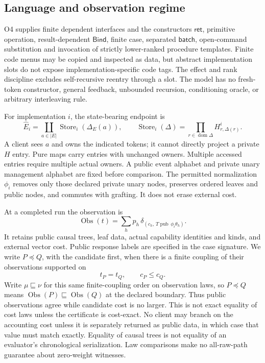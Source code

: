 \documentclass[11pt,a4paper]{article}
\theoremstyle{definition}
\newcommand{\Store}{\operatorname{Store}}
\newcommand{\Obs}{\operatorname{Obs}}
\newcommand{\dom}{\operatorname{dom}}
\newcommand{\Ret}{\mathsf{ret}}
\newcommand{\Bind}{\mathsf{Bind}}
\newcommand{\Batch}{\mathsf{batch}}
\begin{document}
\subsection{Language and observation regime}\label{sec:core-language}
O4 supplies finite dependent interfaces and the constructors
$\Ret$, primitive operation, result-dependent $\Bind$, finite case,
separated $\Batch$, open-command substitution and invocation of strictly
lower-ranked procedure templates. Finite code menus may be copied and
inspected as data, but abstract implementation slots do not expose
implementation-specific code tags. The effect and rank discipline excludes
self-recursive reentry through a slot. The model has no fresh-token
constructor, general feedback, unbounded recursion, conditioning oracle,
or arbitrary interleaving rule.

For implementation $i$, the state-bearing endpoint is
\begin{equation}\label{eq:private-endpoint}
\widehat E_i=\coprod_{a\in|E|}\Store_i(\Delta_E(a)),\qquad
\Store_i(\Delta)=\prod_{r\in\dom\Delta}H^i_{r,\Delta(r)}.
\end{equation}
A client sees $a$ and owns the indicated tokens; it cannot directly
project a private $H$ entry. Pure maps carry entries with unchanged
owners. Multiple accessed entries require multiple actual owners.
A public event alphabet and private unary management alphabet are fixed
before comparison. The permitted normalization $\phi_i$ removes only
those declared private unary nodes, preserves ordered leaves and public
nodes, and commutes with grafting. It does not erase external cost.

At a completed run the observation is
\begin{equation}\label{eq:obs}
\Obs(t)=\sum_h p_h\,
 \delta_{(c_h,\,T\operatorname{pub}\,\phi_i\theta_h)}.
\end{equation}
It retains public causal trees, leaf data, actual capability identities
and kinds, and external vector cost. Public response labels are specified
in the case signature. We write $P\preceq Q$, with the candidate first,
when there is a finite coupling of their observations supported on
\[
 t_P=t_Q,\qquad c_P\leq c_Q.
\]
Write $\mu\sqsubseteq\nu$ for this same finite-coupling order on
observation laws, so $P\preceq Q$ means $\Obs(P)\sqsubseteq\Obs(Q)$
at the declared boundary. Thus public observations agree while candidate
cost is no larger. This
is not exact equality of cost laws unless the certificate is cost-exact.
No client may branch on the accounting cost unless it is separately
returned as public data, in which case that value must match exactly.
Equality of causal trees is not equality of an evaluator's chronological
serialization. Law comparisons make no all-raw-path guarantee about
zero-weight witnesses.
\end{document}
